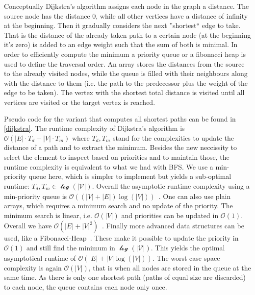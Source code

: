             Conceptually Dijkstra's algorithm assigns each node in the graph a distance. 
            The source node has the distance 0, while all other vertices have a distance of infinity at the beginning.
            Then it gradually considers the next ''shortest`` edge to take.
            That is the distance of the already taken path to a certain node (at the beginning it's zero) is added to an edge weight such that the sum of both is minimal. 
            In order to efficiently compute the minimum a priority queue or a fibonacci heap is used to define the traversal order. 
            An array stores the distances from the source to the already visited nodes, while the queue is filled with their neighbours along with the distance to them (i.e. the path to the predecessor plus the weight of the edge to be taken). 
            The vertex with the shortest total distance is visited until all vertices are visited or the target vertex is reached.
            
            Pseudo code for the variant that computes all shortest paths can be found in \ref{dijkstra}. 
            The runtime complexity of Dijkstra's algorithm is $\mathcal{O}(|E| \cdot T_d + |V| \cdot T_m)$ where $T_d, T_m$ stand for the complexities to update the distance of a path and to extract the minimum.
            Besides the new neccissity to select the element to inspect based on priorities and to maintain those, the runtime complexity is equivalent to what we had with BFS.        
            We use a min-priority queue here, which is simpler to implement but yields a sub-optimal runtime: 
            $T_d, T_m \in \mathcal{\log(|V|)}$. 
            Overall the asymptotic runtime complexity using a min-priority queue is $\mathcal{O}((|V| + |E|)\log(|V|))$~\autocite{Goodrich2014AlgorithmDA}.        
            One can also use plain arrays, which requires a minimum search and no update of the priority. 
            The minimum search is linear, i.e. $\mathcal{O}(|V|)$ and priorities can be updated in $\mathcal{O}(1)$. 
            Overall we have $\mathcal{O}(|E| + |V|^2)$~\autocite{Goodrich2014AlgorithmDA}.        
            Finally more advanced data structures can be used, like a Fibonacci-Heap~\autocite{cormen2009introduction}. 
            These make it possible to update the priority in $\mathcal{O}(1)$ and still find the minimum in $\mathcal{\log(|V|)}$. 
            This yields the optimal asymptotical runtime of $\mathcal{O}(|E| + |V|\log(|V|))$. 
            The worst case space complexity is again $\mathcal{O}(|V|)$, that is when all nodes are stored in the queue at the same time. 
            As there is only one shortest path (paths of equal size are discarded) to each node, the queue contains each node only once.
            
